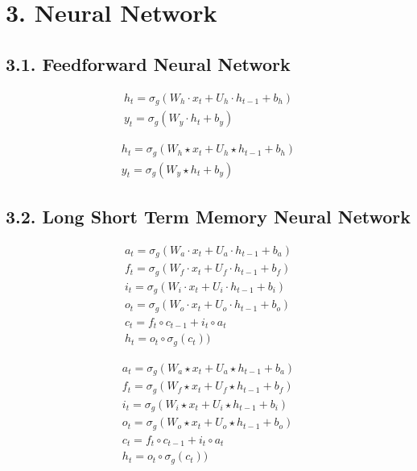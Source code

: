 \documentclass[
]{article}
\begin{document}
\hypertarget{neural-network}{%
\section{3. Neural Network}\label{neural-network}}

\hypertarget{feedforward-neural-network}{%
\subsection{3.1. Feedforward Neural
Network}\label{feedforward-neural-network}}

\[{\displaystyle {\begin{aligned}h_{t} = \sigma_{g}(W_{h} \cdot x_{t}+U_{h} \cdot h_{t-1}+b_{h})\\y_{t} = \sigma_{g}(W_{y} \cdot h_{t}+b_{y})\end{aligned}}}\]

\[{\displaystyle {\begin{aligned}h_{t} = \sigma_{g}(W_{h} \star x_{t}+U_{h} \star h_{t-1}+b_{h})\\y_{t} = \sigma_{g}(W_{y} \star h_{t}+b_{y})\end{aligned}}}\]

\hypertarget{long-short-term-memory-neural-network}{%
\subsection{3.2. Long Short Term Memory Neural
Network}\label{long-short-term-memory-neural-network}}

\[{\displaystyle {\begin{aligned}a_{t} = \sigma_{g}(W_{a} \cdot x_{t}+U_{a} \cdot h_{t-1}+b_{a})\\f_{t} = \sigma_{g}(W_{f} \cdot x_{t}+U_{f} \cdot h_{t-1}+b_{f})\\i_{t} = \sigma_{g}(W_{i} \cdot x_{t}+U_{i} \cdot h_{t-1}+b_{i})\\o_{t} = \sigma_{g}(W_{o} \cdot x_{t}+U_{o} \cdot h_{t-1}+b_{o})\\c_{t} = f_{t} \circ c_{t-1}+i_{t} \circ a_{t}\\h_{t} = o_{t} \circ \sigma_{g}(c_{t}))\end{aligned}}}\]

\[{\displaystyle {\begin{aligned}a_{t} = \sigma_{g}(W_{a} \star x_{t}+U_{a} \star h_{t-1}+b_{a})\\f_{t} = \sigma_{g}(W_{f} \star x_{t}+U_{f} \star h_{t-1}+b_{f})\\i_{t} = \sigma_{g}(W_{i} \star x_{t}+U_{i} \star h_{t-1}+b_{i})\\o_{t} = \sigma_{g}(W_{o} \star x_{t}+U_{o} \star h_{t-1}+b_{o})\\c_{t} = f_{t} \circ c_{t-1}+i_{t} \circ a_{t}\\h_{t} = o_{t} \circ \sigma_{g}(c_{t}))\end{aligned}}}\]
\end{document}
